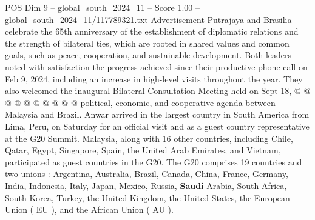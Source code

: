 \begin{textsample}{POS Dim 9 – global\_south\_2024\_11 – Score 1.00 – global\_south\_2024\_11/117789321.txt}
Advertisement Putrajaya and Brasilia celebrate the 65th anniversary of the establishment of diplomatic relations and the strength of bilateral ties, which are rooted in shared values and common goals, such as peace, cooperation, and sustainable development.
Both leaders noted with satisfaction the progress achieved since their productive phone call on Feb 9, 2024, including an increase in high-level visits throughout the year.
They also welcomed the inaugural Bilateral Consultation Meeting held on Sept 18, @ @ @ @ @ @ @ @ @ @ political, economic, and cooperative agenda between Malaysia and Brazil.
Anwar arrived in the largest country in South America from Lima, Peru, on Saturday for an official visit and as a guest country representative at the G20 Summit.
Malaysia, along with 16 other countries, including Chile, Qatar, Egypt, Singapore, Spain, the United Arab Emirates, and Vietnam, participated as guest countries in the G20.
The G20 comprises 19 countries and two unions : Argentina, Australia, Brazil, Canada, China, France, Germany, India, Indonesia, Italy, Japan, Mexico, Russia, \textbf{Saudi} Arabia, South Africa, South Korea, Turkey, the United Kingdom, the United States, the European Union ( EU ), and the African Union ( AU ).

\end{textsample}
